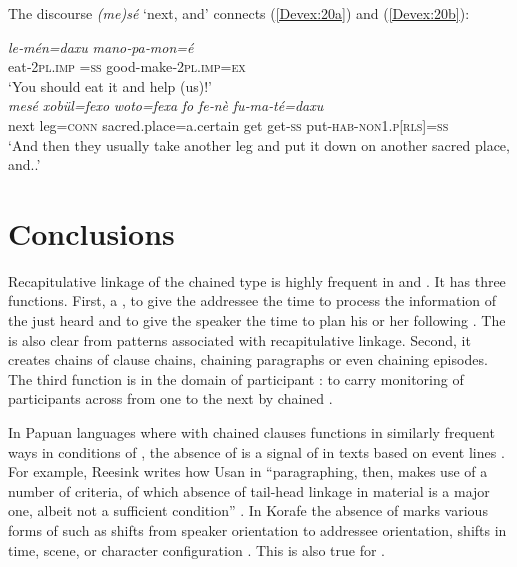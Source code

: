 \documentclass[output=paper]{LSP/langsci}
\begin{document}
The discourse  \textit{(me)sé} `next, and' connects (\ref{Devex:20a}) and (\ref{Devex:20b}):

\begin{exe}
\ex \label{Devex:20ab}
\begin{xlist}
\ex \label{Devex:20a}			     
\gll \textit{le‑mén=daxu} \textit{mano‑pa‑mon=é}\\
eat‑\textsc{2pl.imp =ss}	good-make‑\textsc{2pl.imp=ex}\\
\glt `You should  eat it and help (us)!'\\
	
\ex \label{Devex:20b}			     
\gll \textit{mesé} \textit{xobül=fexo} \textit{woto=fexa} \textit{fo} \textit{fe‑nè} \textit{fu‑ma‑té=daxu}\\
next leg=\textsc{conn} sacred.place=a.certain get get‑\textsc{ss} put‑\textsc{hab-non1.p[rls]=ss}\\
\glt `And then they usually take another leg and put it down on another sacred place, and..'\\
\end{xlist}
\end{exe}

\section{Conclusions} 
\label{DevConclusions}
Recapitulative linkage of the chained type is highly frequent in   and . It has three functions. First, a , to give the addressee the time to process the information of  the  just heard and to give the speaker the time to plan his or her following . The  is also clear from  patterns associated with recapitulative linkage.  Second, it creates chains of clause chains, chaining paragraphs or even chaining episodes.  The third function  is in the domain of participant : to carry   monitoring of participants across from one  to the next by chained .  

In Papuan languages where  with chained clauses functions in similarly frequent ways in conditions of , the absence of  is a signal of  in texts based on  event lines \citep[][375]{devries.2005}.  For example, Reesink writes how Usan in ``paragraphing, then, makes use of a number of criteria, of which absence of tail-head linkage in  material is a major one, albeit not a sufficient condition'' \citep[][332]{reesink87}. In Korafe the absence of  marks various forms of  such as shifts from speaker orientation to addressee orientation, shifts in time, scene, or character configuration \citep[][337, 363]{farr99}. This is also true for . 
\end{document}
